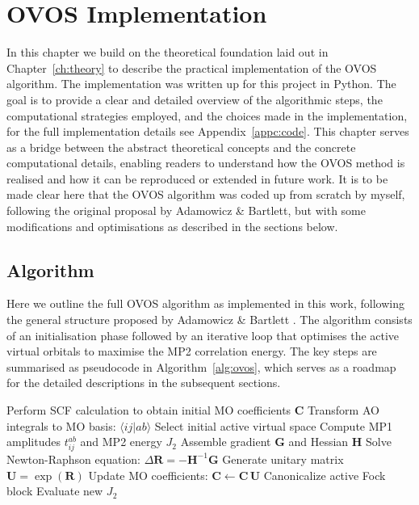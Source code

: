 \chapter{OVOS Implementation}
\label{ch:method}

In this chapter we build on the theoretical foundation laid out in Chapter~\ref{ch:theory} to describe the practical implementation of the OVOS algorithm. The implementation was written up for this project in Python. The goal is to provide a clear and detailed overview of the algorithmic steps, the computational strategies employed, and the choices made in the implementation, for the full implementation details see Appendix~\ref{appc:code}. 
This chapter serves as a bridge between the abstract theoretical concepts and the concrete computational details, enabling readers to understand how the OVOS method is realised and how it can be reproduced or extended in future work. It is to be made clear here that the OVOS algorithm was coded up from scratch by myself, following the original proposal by Adamowicz \& Bartlett, but with some modifications and optimisations as described in the sections below.


\section{Algorithm}
\label{sec:method_algorithm}

Here we outline the full OVOS algorithm as implemented in this work, following the general structure proposed by Adamowicz \& Bartlett \cite{Adamowicz1987}. The algorithm consists of an initialisation phase followed by an iterative loop that optimises the active virtual orbitals to maximise the MP2 correlation energy. The key steps are summarised as pseudocode in Algorithm~\ref{alg:ovos}, which serves as a roadmap for the detailed descriptions in the subsequent sections.

\begin{algorithm}[H]
\caption{OVOS Iterative Optimisation}
\label{alg:ovos}
\begin{algorithmic}[1]
  \State Perform SCF calculation to obtain initial MO coefficients $\mathbf{C}$
  \State Transform AO integrals to MO basis: $\langle ij|ab\rangle$
  \State Select initial active virtual space
  \Repeat
    \State Compute MP1 amplitudes $t_{ij}^{ab}$ and MP2 energy $J_2$
    \State Assemble gradient $\mathbf{G}$ and Hessian $\mathbf{H}$
    \State Solve Newton-Raphson equation: $\Delta\mathbf{R} = -\mathbf{H}^{-1}\mathbf{G}$
    \State Generate unitary matrix $\mathbf{U} = \exp(\mathbf{R})$
    \State Update MO coefficients: $\mathbf{C} \leftarrow \mathbf{C}\,\mathbf{U}$
    \State Canonicalize active Fock block
    \State Evaluate new $J_2$
\end{algorithmic}
\end{algorithm}

